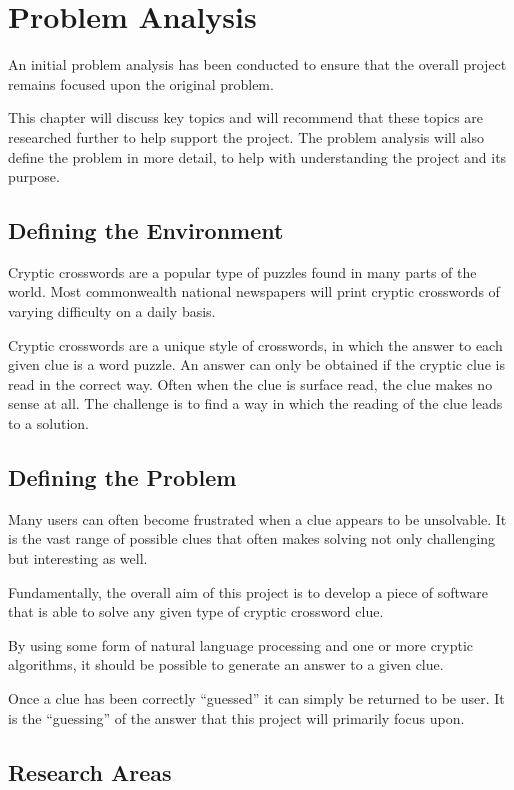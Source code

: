 \section{Problem Analysis}

An initial problem analysis has been conducted to ensure that the overall 
project remains focused upon the original problem.

This chapter will discuss key topics and will recommend that these topics are 
researched further to help support the project. The problem analysis will also 
define the problem in more detail, to help with understanding the project and 
its purpose.


\subsection{Defining the Environment}

Cryptic crosswords are a popular type of puzzles found in many parts of the 
world. Most commonwealth national newspapers will print cryptic crosswords of 
varying difficulty on a daily basis.

Cryptic crosswords are a unique style of crosswords, in which the answer to 
each given clue is a word puzzle. An answer can only be obtained if the cryptic
clue is read in the correct way. Often when the clue is surface read, the clue 
makes no sense at all. The challenge is to find a way in which the reading of 
the clue leads to a solution.


\subsection{Defining the Problem}

Many users can often become frustrated when a clue appears to be unsolvable. It
is the vast range of possible clues that often makes solving not only 
challenging but interesting as well.

Fundamentally, the overall aim of this project is to develop a piece of 
software that is able to solve any given type of cryptic crossword clue.

By using some form of natural language processing and one or more cryptic 
algorithms, it should be possible to generate an answer to a given clue.

Once a clue has been correctly ``guessed'' it can simply be returned to be 
user. It is the ``guessing'' of the answer that this project will primarily 
focus upon.


\subsection{Research Areas}

